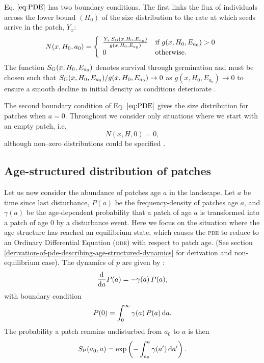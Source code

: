 \documentclass[10pt,twoside]{article}
\begin{document}
Eq. \(\ref{eq:PDE}\) has two boundary conditions. The first links the
flux of individuals across the lower bound \((H_0)\) of the size
distribution to the rate at which seeds arrive in the patch, \(Y_x\):
\begin{equation} \label{eq:BC1}
  N(x, H_0, a_0) = \left\{
  \begin{array}{ll}   \frac{Y_x \, S_{\rm G} (x, H_0, E_{a_0}) }{ g(x, H_0, E_{a_0}) }  & \textrm{if } g(x, H_0, E_{a_0}) > 0 \\
  0 & \textrm{otherwise.}
  \end{array} \right.
\end{equation}
The function \(S_{\rm G} (x, H_0, E_{a_0})\) denotes survival through
germination and must be chosen such that
\(S_{\rm G} (x, H_0, E_{a_0}) / g(x, H_0, E_{a_0}) \rightarrow 0\) as
\(g(x, H_0, E_{a_0}) \rightarrow 0\) to ensure a smooth decline in
initial density as conditions deteriorate \citep{Falster-2011}.

The second boundary condition of Eq. \(\ref{eq:PDE}\) gives the size
distribution for patches when \(a = 0\). Throughout we consider only
situations where we start with an empty patch, i.e.
\begin{equation} \label{eq:BC2} N\left(x, H,0\right) = 0,
\end{equation}
although non--zero distributions could be specified
\citep[e.g][]{Moorcroft-2001}.

\subsection{Age-structured distribution of
patches}\label{age-structured-distribution-of-patches}

Let us now consider the abundance of patches age \(a\) in the landscape.
Let \(a\) be time since last disturbance, \(P(a)\) be the
frequency-density of patches age \(a\), and \(\gamma(a)\) be the
age-dependent probability that a patch of age \(a\) is transformed into
a patch of age 0 by a disturbance event. Here we focus on the situation
where the age structure has reached an equilibrium state, which causes
the \textsc{pde} to reduce to an Ordinary Differential Equation (\textsc{ode}) with
respect to patch age. (See section
\ref{derivation-of-pde-describing-age-structured-dynamics} for derivation and
non-equilibrium case). The dynamics of \(p\) are given by
\citep{Vonfoerster-1959, Mckendrick-1926}:
\begin{equation} \label{eq:agepde}
\frac{{\rm d}}{{\rm d} a} P(a) = - \gamma(a) \, P(a) ,
\end{equation}
with boundary condition
\begin{equation}  P(0) = \int_0^\infty \gamma(a) \, P(a) \, {\rm d} a.
\end{equation}
The probability a patch remains undisturbed from \(a_0\) to \(a\) is
then
\begin{equation} \label{eq:survivalPatch}
  S_{\rm P} (a_0, a) = \exp\left( - \int_{a_0}^{a} \gamma(a^\prime) \, {\rm d} a^\prime \right).
\end{equation}
\end{document}
